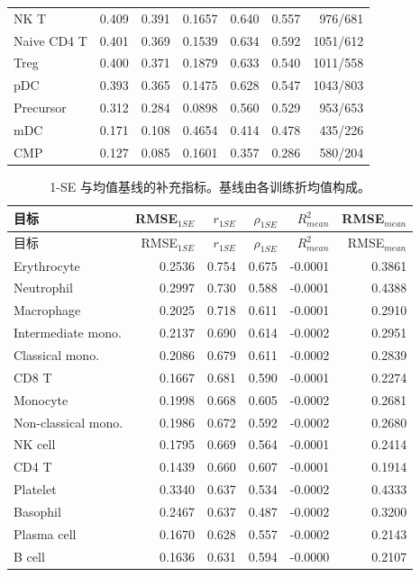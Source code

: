 {\begin{longtable}{lrrrrrr}
NK T & 0.409 & 0.391 & 0.1657 & 0.640 & 0.557 & 976/681\\
Naive CD4 T & 0.401 & 0.369 & 0.1539 & 0.634 & 0.592 & 1051/612\\
Treg & 0.400 & 0.371 & 0.1879 & 0.633 & 0.540 & 1011/558\\
pDC & 0.393 & 0.365 & 0.1475 & 0.628 & 0.547 & 1043/803\\
Precursor & 0.312 & 0.284 & 0.0898 & 0.560 & 0.529 & 953/653\\
mDC & 0.171 & 0.108 & 0.4654 & 0.414 & 0.478 & 435/226\\
CMP & 0.127 & 0.085 & 0.1601 & 0.357 & 0.286 & 580/204\\
\bottomrule\end{longtable}}
{\footnotesize\linespread{1}\selectfont\setlength{\tabcolsep}{4pt}\renewcommand{\arraystretch}{1.08}\begin{longtable}{lrrrrr}\caption{1-SE 与均值基线的补充指标。基线由各训练折均值构成。}\\\toprule 目标 & RMSE$_{1SE}$ & $r_{1SE}$ & $\rho_{1SE}$ & $R^2_{mean}$ & RMSE$_{mean}$\\\midrule\endfirsthead\toprule 目标 & RMSE$_{1SE}$ & $r_{1SE}$ & $\rho_{1SE}$ & $R^2_{mean}$ & RMSE$_{mean}$\\\midrule\endhead
Erythrocyte & 0.2536 & 0.754 & 0.675 & -0.0001 & 0.3861\\
Neutrophil & 0.2997 & 0.730 & 0.588 & -0.0001 & 0.4388\\
Macrophage & 0.2025 & 0.718 & 0.611 & -0.0001 & 0.2910\\
Intermediate mono. & 0.2137 & 0.690 & 0.614 & -0.0002 & 0.2951\\
Classical mono. & 0.2086 & 0.679 & 0.611 & -0.0002 & 0.2839\\
CD8 T & 0.1667 & 0.681 & 0.590 & -0.0001 & 0.2274\\
Monocyte & 0.1998 & 0.668 & 0.605 & -0.0002 & 0.2681\\
Non-classical mono. & 0.1986 & 0.672 & 0.592 & -0.0002 & 0.2680\\
NK cell & 0.1795 & 0.669 & 0.564 & -0.0001 & 0.2414\\
CD4 T & 0.1439 & 0.660 & 0.607 & -0.0001 & 0.1914\\
Platelet & 0.3340 & 0.637 & 0.534 & -0.0002 & 0.4333\\
Basophil & 0.2467 & 0.637 & 0.487 & -0.0002 & 0.3200\\
Plasma cell & 0.1670 & 0.628 & 0.557 & -0.0002 & 0.2143\\
B cell & 0.1636 & 0.631 & 0.594 & -0.0000 & 0.2107\\

\end{longtable}}
